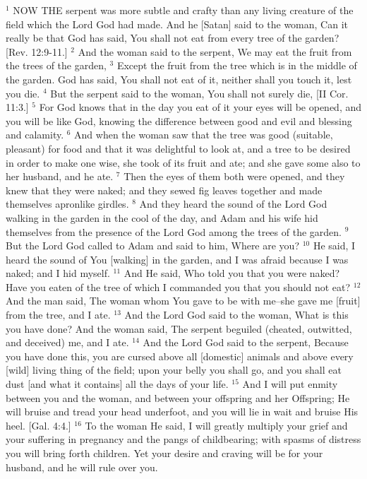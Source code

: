$^{1}$ NOW THE serpent was more subtle and crafty than any living creature of the field which the Lord God had made. And he [Satan] said to the woman, Can it really be that God has said, You shall not eat from every tree of the garden? [Rev. 12:9-11.]
$^{2}$ And the woman said to the serpent, We may eat the fruit from the trees of the garden,
$^{3}$ Except the fruit from the tree which is in the middle of the garden. God has said, You shall not eat of it, neither shall you touch it, lest you die.
$^{4}$ But the serpent said to the woman, You shall not surely die, [II Cor. 11:3.]
$^{5}$ For God knows that in the day you eat of it your eyes will be opened, and you will be like God, knowing the difference between good and evil and blessing and calamity.
$^{6}$ And when the woman saw that the tree was good (suitable, pleasant) for food and that it was delightful to look at, and a tree to be desired in order to make one wise, she took of its fruit and ate; and she gave some also to her husband, and he ate.
$^{7}$ Then the eyes of them both were opened, and they knew that they were naked; and they sewed fig leaves together and made themselves apronlike girdles.
$^{8}$ And they heard the sound of the Lord God walking in the garden in the cool of the day, and Adam and his wife hid themselves from the presence of the Lord God among the trees of the garden.
$^{9}$ But the Lord God called to Adam and said to him, Where are you?
$^{10}$ He said, I heard the sound of You [walking] in the garden, and I was afraid because I was naked; and I hid myself.
$^{11}$ And He said, Who told you that you were naked? Have you eaten of the tree of which I commanded you that you should not eat?
$^{12}$ And the man said, The woman whom You gave to be with me–she gave me [fruit] from the tree, and I ate.
$^{13}$ And the Lord God said to the woman, What is this you have done? And the woman said, The serpent beguiled (cheated, outwitted, and deceived) me, and I ate.
$^{14}$ And the Lord God said to the serpent, Because you have done this, you are cursed above all [domestic] animals and above every [wild] living thing of the field; upon your belly you shall go, and you shall eat dust [and what it contains] all the days of your life.
$^{15}$ And I will put enmity between you and the woman, and between your offspring and her Offspring; He will bruise and tread your head underfoot, and you will lie in wait and bruise His heel. [Gal. 4:4.]
$^{16}$ To the woman He said, I will greatly multiply your grief and your suffering in pregnancy and the pangs of childbearing; with spasms of distress you will bring forth children. Yet your desire and craving will be for your husband, and he will rule over you.
